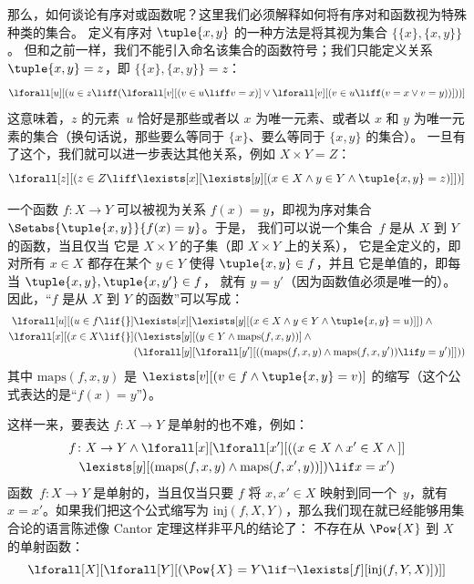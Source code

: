 \documentclass[../../../include/open-logic-section]{subfiles}
\begin{document}
那么，如何谈论有序对或函数呢？这里我们必须解释如何将有序对和函数视为特殊种类的集合。
定义有序对 $\tuple{x, y}$ 的一种方法是将其视为集合 $\{\{x\}, \{x, y\}\}$。
但和之前一样，我们不能引入命名该集合的函数符号；我们只能定义关系 $\tuple{x, y} = z$，即 $\{\{x\}, \{x, y\}\} = z$：
\[
\lforall[u][(u \in z \liff (\lforall[v][(v \in u \liff v = x)] \lor
  \lforall[v][(v \in u \liff (v = x \lor v = y))]))]
\]
这意味着，$z$ 的元素~$u$ 恰好是那些或者以 $x$ 为唯一元素、或者以 $x$ 和 $y$ 为唯一元素的集合（换句话说，那些要么等同于 $\{x\}$、要么等同于 $\{x, y\}$ 的集合）。
一旦有了这个，我们就可以进一步表达其他关系，例如 $X \times Y = Z$：
\[
\lforall[z][(z \in Z \liff \lexists[x][\lexists[y][(x \in
        X \land y \in Y \land \tuple{x, y} = z)]])]
\]

一个函数 $f \colon X \to Y$ 可以被视为关系 $f(x)
= y$，即视为序对集合~$\Setabs{\tuple{x,y}}{f(x) = y}$。于是，
我们可以说一个集合~$f$ 是从 $X$ 到 $Y$ 的函数，当且仅当 它是 $X \times Y$ 的子集（即 $X \times Y$ 上的关系）， 它是全定义的，即对所有 $x
\in X$ 都存在某个 $y \in Y$ 使得 $\tuple{x, y} \in f$，并且 它是单值的，即每当 $\tuple{x, y}, \tuple{x, y'} \in f$，
就有 $y = y'$（因为函数值必须是唯一的）。因此，“$f$ 是从 $X$ 到 $Y$ 的函数”可以写成：
\begin{align*}
 \lforall[u][(u \in f \lif {}] & \lexists[x][\lexists[y][(x \in X \land y \in
      Y \land \tuple{x, y} = u)]]) \land {}\\
 \lforall[x][(x \in X \lif {}] &
      (\lexists[y][(y \in Y \land \mathrm{maps}(f, x, y))] \land {}\\
& (\lforall[y][\lforall[y'][((\mathrm{maps}(f, x, y) \land
    \mathrm{maps}(f, x, y')) \lif y = y')]]))
\end{align*}
其中 $\mathrm{maps}(f, x, y)$ 是 $\lexists[v][(v \in f \land
  \tuple{x, y} = v)]$ 的缩写（这个公式表达的是“$f(x) = y$”）。

这样一来，要表达 $f\colon X \to Y$ 是单射的也不难，例如：
\begin{multline*}
 f \colon X \to Y \land \lforall[x][\lforall[x'][((x \in X \land x' \in
     X \land {}]] \\
 \lexists[y][(\mathrm{maps}(f, x, y) \land \mathrm{maps}(f,
        x', y))]) \lif x = x')
\end{multline*}
函数~$f\colon X \to Y$ 是单射的，当且仅当只要 $f$ 将 $x, x'
\in X$ 映射到同一个~$y$，就有 $x = x'$。如果我们把这个公式缩写为
$\mathrm{inj}(f, X, Y)$，那么我们现在就已经能够用集合论的语言陈述像 Cantor 定理这样非平凡的结论了：
不存在从 $\Pow{X}$ 到 $X$ 的单射函数：
\[
\lforall[X][\lforall[Y][(\Pow{X} = Y \lif
    \lnot\lexists[f][\mathrm{inj}(f, Y, X)])]]
\]
\end{document}
